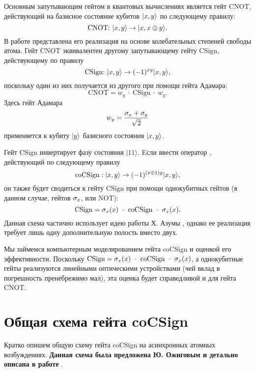 Основным запутывающим гейтом в квантовых вычислениях является гейт CNOT, действующий на базисное состояние кубитов $|x, y\rangle$ по следующему правилу:
\[
\text{CNOT:}~|x, y\rangle \rightarrow |x, x \oplus y\rangle.
\]
В работе \cite{quantum_gates_monroe} представлена его реализация на основе колебательных степеней свободы атома. Гейт $\text{CNOT}$ эквивалентен другому запутывающему гейту $\text{CSign}$, действующему по правилу
\[
\text{CSign:}~|x, y\rangle \rightarrow (-1)^{xy}|x, y\rangle,
\]
поскольку один из них получается из другого при помощи гейта Адамара:
\[
\text{CNOT} = w_{y}~\cdot~\text{CSign}~\cdot~w_{y}.
\]
Здесь гейт Адамара 
\[
\displaystyle w_{y} = \frac{\sigma_{x} + \sigma_{y}}{\sqrt{2}}
\]
применяется к кубиту $|y\rangle$ базисного состояния $|x, y\rangle$.

Гейт $\text{CSign}$ инвертирует фазу состояния $|11\rangle$. Eсли ввести оператор , действующий по следующему правилу
\[
\text{coCSign}: |x, y\rangle \rightarrow (-1)^{(x \oplus 1)y}|x, y\rangle,
\]
он также будет сводиться к гейту $\text{CSign}$ при помощи однокубитных гейтов (в данном случае, гейтов $\sigma_{x}$, или $\text{NOT}$):
\[
\text{CSign} = \sigma_{x}(x)~\cdot~\text{coCSign}~\cdot~\sigma_{x}(x).
\]
\indent Данная схема частично использует идею работы Х. Азумы \cite{azuma}, однако ее реализация требует лишь одну дополнительную полость вместо двух.

Мы займемся компьютерным моделированием гейта coCSign и оценкой его эффективности. Поскольку $\text{CSign} = \sigma_{x}(x)~\cdot~\text{coCSign}~\cdot~\sigma_{x}(x)$, а однокубитные гейты реализуются линейными оптическими устройствами (чей вклад в погрешность пренебрежимо мал), эта оценка будет справедливой и для гейта $\text{CNOT}$.

\clearpage
\section{Общая схема гейта coCSign}\label{sec:ch5/sect2}

Кратко опишем общую схему гейта coCSign на асинхронных атомных возбуждениях. \textbf{Данная схема была предложена Ю. Ожиговым и детально описана в работе \cite{ozhigov_quantum_gates}}.

